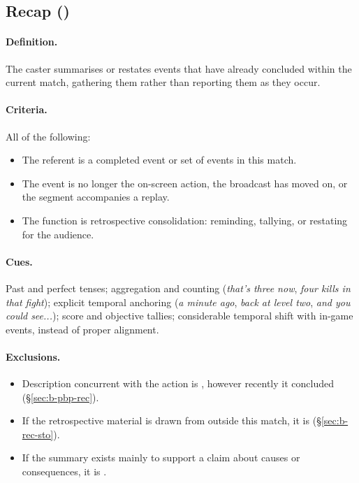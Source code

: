 \subsection{Recap (\cREC{})}
\label{sec:def-rec}

\paragraph{Definition.} The caster summarises or restates events that have already concluded within the current match, gathering them rather than reporting them as they occur.

\paragraph{Criteria.} All of the following:
\begin{itemize}
  \item The referent is a completed event or set of events in this match.
  \item The event is no longer the on-screen action, the broadcast has moved on, or the segment accompanies a replay.
  \item The function is retrospective consolidation: reminding, tallying, or restating for the audience.
\end{itemize}

\paragraph{Cues.} Past and perfect tenses; aggregation and counting (\emph{that's three now}, \emph{four kills in that fight}); explicit temporal anchoring (\emph{a minute ago}, \emph{back at level two}, \emph{and you could see...}); score and objective tallies; considerable temporal shift with in-game events, instead of proper alignment.

\paragraph{Exclusions.}
\begin{itemize}
  \item Description concurrent with the action is \PBP{}, however recently it concluded (\S\ref{sec:b-pbp-rec}).
  \item If the retrospective material is drawn from outside this match, it is \STO{} (\S\ref{sec:b-rec-sto}).
  \item If the summary exists mainly to support a claim about causes or consequences, it is \SA{}.
\end{itemize}

